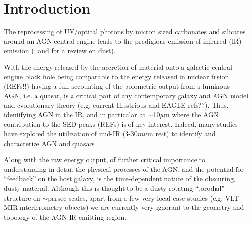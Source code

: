 \documentclass{emulateapj}
\begin{document}

\maketitle


\section{Introduction}
The reprocessing of UV/optical photons by micron sized carbonates and
silicates around an AGN central engine leads to the prodigious emission
of infrared (IR) emission (\citet[See][for review on AGN infrared
emission]{Elitzur14}; \citet[][for a review on the Unified Model of
Active Galactic Nuclei]{Netzer15} and \citet[][]{Draine03} for a
review on dust).

With the energy released by the accretion of material onto a galactic
central engine black hole being comparable to the energy released in
nuclear fusion (REFs!!) having a full accounting of the bolometric
output from a luminous AGN, i.e. a quasar, is a critical part of any
contemporary galaxy and AGN model and evolutionary theory (e.g. current
Illustrious and EAGLE refs??). Thus, identifying AGN in the IR, and in
particular at $\sim$10$\mu$m where the AGN contribution to the SED
peaks (REFs) is of key interest. Indeed, many studies have explored
the utilization of mid-IR (3-30$mu$m rest) to identify and characterize
AGN and quasars \citep{Lacy04, Stern05, Martinez-Sansigre06,
Richards09b, Donley12, Stern12, Banerji13, Assef13, Richards15,
Timlin16}. 

Along with the raw energy output, of further critical importance to
understanding in detail the physical processes of the AGN, and the
potential for ``feedback'' on the host galaxy, is the time-dependent
nature of the obscuring, dusty material. Although this is thought to
be a dusty rotating ``torodial'' structure on $\sim$parsec scales,
apart from a few very local case studies (e.g. VLT MIR interferometry
objects) we are currently very ignorant to the geometry and topology
of the AGN IR emitting region.
\end{document}
